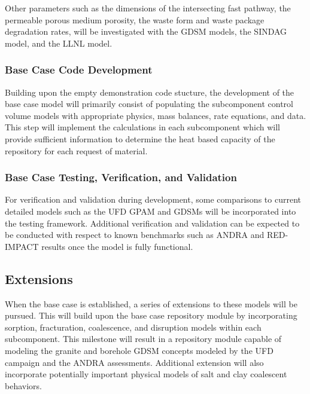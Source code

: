 \clearpage


Other parameters such as the dimensions of the intersecting fast pathway, the 
permeable porous medium porosity, the waste form and waste package degradation 
rates, will be investigated with the \gls{GDSM} models, the \gls{SINDAG} model, 
and the \gls{LLNL} model. 

\subsubsection{Base Case Code Development}

  
  Building upon the empty demonstration code stucture, the development of the 
  base case model will primarily consist of populating the subcomponent control 
  volume models with appropriate physics, mass balances, rate equations, and 
  data. This step will implement the calculations in each subcomponent which 
  will provide sufficient information to determine the heat based capacity of 
  the repository for each request of material. 
 
  
\subsubsection{Base Case Testing, Verification, and Validation}

   

  For verification and validation during development, some comparisons to current 
  detailed models such as the \gls{UFD} \gls{GPAM} and GDSMs will be 
  incorporated into the testing framework. Additional verification and 
  validation can be expected to be conducted with respect to known benchmarks 
  such as \gls{ANDRA} and RED-IMPACT results once the model is fully functional.


\subsection{Extensions}


When the base case is established, a series of extensions to these models will 
be pursued.  This will build upon the base case repository module by 
incorporating sorption, fracturation, coalescence, and disruption 
models within each subcomponent.  This milestone will result in a repository 
module capable of modeling the granite and borehole \gls{GDSM} concepts modeled 
by the \gls{UFD} campaign and the \gls{ANDRA} assessments. Additional extension 
will also incorporate potentially important physical models of salt and clay
coalescent behaviors. 

